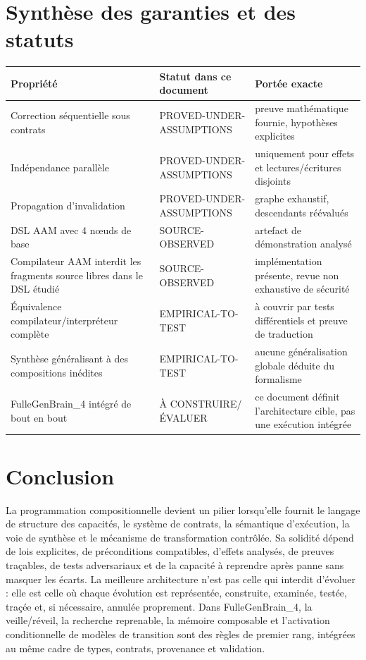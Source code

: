\documentclass[11pt,a4paper]{article}
\theoremstyle{definition}
\theoremstyle{plain}
\theoremstyle{remark}
\begin{document}
\section{Synthèse des garanties et des statuts}
\begin{longtable}{p{}p{}p{}}
\toprule Propriété & Statut dans ce document & Portée exacte \\
\midrule
Correction séquentielle sous contrats & PROVED-UNDER-ASSUMPTIONS & preuve mathématique fournie, hypothèses explicites \\
Indépendance parallèle & PROVED-UNDER-ASSUMPTIONS & uniquement pour effets et lectures/écritures disjoints \\
Propagation d'invalidation & PROVED-UNDER-ASSUMPTIONS & graphe exhaustif, descendants réévalués \\
DSL AAM avec 4 nœuds de base & SOURCE-OBSERVED & artefact de démonstration analysé \\
Compilateur AAM interdit les fragments source libres dans le DSL étudié & SOURCE-OBSERVED & implémentation présente, revue non exhaustive de sécurité \\
Équivalence compilateur/interpréteur complète & EMPIRICAL-TO-TEST & à couvrir par tests différentiels et preuve de traduction \\
Synthèse généralisant à des compositions inédites & EMPIRICAL-TO-TEST & aucune généralisation globale déduite du formalisme \\
FulleGenBrain\_4 intégré de bout en bout & À CONSTRUIRE/ÉVALUER & ce document définit l'architecture cible, pas une exécution intégrée \\
\bottomrule
\end{longtable}

\section{Conclusion}
La programmation compositionnelle devient un pilier lorsqu'elle fournit le langage de structure des capacités, le système de contrats, la sémantique d'exécution, la voie de synthèse et le mécanisme de transformation contrôlée. Sa solidité dépend de lois explicites, de préconditions compatibles, d'effets analysés, de preuves traçables, de tests adversariaux et de la capacité à reprendre après panne sans masquer les écarts. La meilleure architecture n'est pas celle qui interdit d'évoluer : elle est celle où chaque évolution est représentée, construite, examinée, testée, traçée et, si nécessaire, annulée proprement. Dans FulleGenBrain\_4, la veille/réveil, la recherche reprenable, la mémoire composable et l'activation conditionnelle de modèles de transition sont des règles de premier rang, intégrées au même cadre de types, contrats, provenance et validation.
\end{document}

